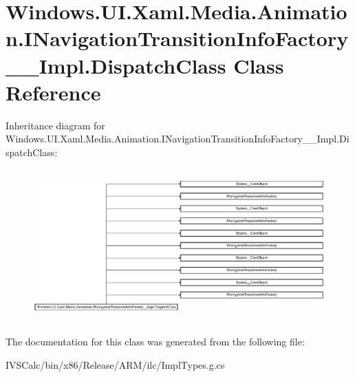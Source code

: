 \hypertarget{class_windows_1_1_u_i_1_1_xaml_1_1_media_1_1_animation_1_1_i_navigation_transition_info_factory_____impl_1_1_dispatch_class}{}\section{Windows.\+U\+I.\+Xaml.\+Media.\+Animation.\+I\+Navigation\+Transition\+Info\+Factory\+\_\+\+\_\+\+Impl.\+Dispatch\+Class Class Reference}
\label{class_windows_1_1_u_i_1_1_xaml_1_1_media_1_1_animation_1_1_i_navigation_transition_info_factory_____impl_1_1_dispatch_class}
Inheritance diagram for Windows.\+U\+I.\+Xaml.\+Media.\+Animation.\+I\+Navigation\+Transition\+Info\+Factory\+\_\+\+\_\+\+Impl.\+Dispatch\+Class\+:\begin{figure}[H]
\begin{center}
\leavevmode
\includegraphics[height=5.900383cm]{class_windows_1_1_u_i_1_1_xaml_1_1_media_1_1_animation_1_1_i_navigation_transition_info_factory_____impl_1_1_dispatch_class}
\end{center}
\end{figure}


The documentation for this class was generated from the following file\+:\begin{DoxyCompactItemize}
\item 
I\+V\+S\+Calc/bin/x86/\+Release/\+A\+R\+M/ilc/Impl\+Types.\+g.\+cs\end{DoxyCompactItemize}
